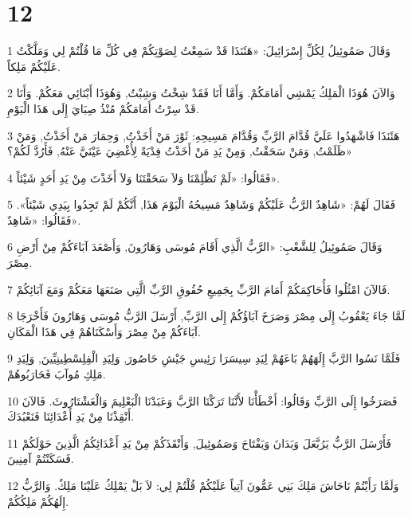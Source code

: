 \chapter{12}

\par 1 وَقَالَ صَمُوئِيلُ لِكُلِّ إِسْرَائِيلَ: «هَئَنَذَا قَدْ سَمِعْتُ لِصَوْتِكُمْ فِي كُلِّ مَا قُلْتُمْ لِي وَمَلَّكْتُ عَلَيْكُمْ مَلِكاً.
\par 2 وَالآنَ هُوَذَا الْمَلِكُ يَمْشِي أَمَامَكُمْ. وَأَمَّا أَنَا فَقَدْ شِخْتُ وَشِبْتُ, وَهُوَذَا أَبْنَائِي مَعَكُمْ. وَأَنَا قَدْ سِرْتُ أَمَامَكُمْ مُنْذُ صِبَايَ إِلَى هَذَا الْيَوْمِ.
\par 3 هَئَنَذَا فَاشْهَدُوا عَلَيَّ قُدَّامَ الرَّبِّ وَقُدَّامَ مَسِيحِهِ: ثَوْرَ مَنْ أَخَذْتُ, وَحِمَارَ مَنْ أَخَذْتُ, وَمَنْ ظَلَمْتُ, وَمَنْ سَحَقْتُ, وَمِنْ يَدِ مَنْ أَخَذْتُ فِدْيَةً لِأُغْضِيَ عَيْنَيَّ عَنْهُ, فَأَرُدَّ لَكُمْ؟»
\par 4 فَقَالُوا: «لَمْ تَظْلِمْنَا وَلاَ سَحَقْتَنَا وَلاَ أَخَذْتَ مِنْ يَدِ أَحَدٍ شَيْئاً».
\par 5 فَقَالَ لَهُمْ: «شَاهِدٌ الرَّبُّ عَلَيْكُمْ وَشَاهِدٌ مَسِيحُهُ الْيَوْمَ هَذَا, أَنَّكُمْ لَمْ تَجِدُوا بِيَدِي شَيْئاً». فَقَالُوا: «شَاهِدٌ».
\par 6 وَقَالَ صَمُوئِيلُ لِلشَّعْبِ: «الرَّبُّ الَّذِي أَقَامَ مُوسَى وَهَارُونَ, وَأَصْعَدَ آبَاءَكُمْ مِنْ أَرْضِ مِصْرَ.
\par 7 فَالآنَ امْثُلُوا فَأُحَاكِمَكُمْ أَمَامَ الرَّبِّ بِجَمِيعِ حُقُوقِ الرَّبِّ الَّتِي صَنَعَهَا مَعَكُمْ وَمَعَ آبَائِكُمْ.
\par 8 لَمَّا جَاءَ يَعْقُوبُ إِلَى مِصْرَ وَصَرَخَ آبَاؤُكُمْ إِلَى الرَّبِّ, أَرْسَلَ الرَّبُّ مُوسَى وَهَارُونَ فَأَخْرَجَا آبَاءَكُمْ مِنْ مِصْرَ وَأَسْكَنَاهُمْ فِي هَذَا الْمَكَانِ.
\par 9 فَلَمَّا نَسُوا الرَّبَّ إِلَهَهُمْ بَاعَهُمْ لِيَدِ سِيسَرَا رَئِيسِ جَيْشِ حَاصُورَ, وَلِيَدِ الْفِلِسْطِينِيِّينَ, وَلِيَدِ مَلِكِ مُوآبَ فَحَارَبُوهُمْ.
\par 10 فَصَرَخُوا إِلَى الرَّبِّ وَقَالُوا: أَخْطَأْنَا لأَنَّنَا تَرَكْنَا الرَّبَّ وَعَبَدْنَا الْبَعْلِيمَ وَالْعَشْتَارُوثَ. فَالآنَ أَنْقِذْنَا مِنْ يَدِ أَعْدَائِنَا فَنَعْبُدَكَ.
\par 11 فَأَرْسَلَ الرَّبُّ يَرُبَّعَلَ وَبَدَانَ وَيَفْتَاحَ وَصَمُوئِيلَ, وَأَنْقَذَكُمْ مِنْ يَدِ أَعْدَائِكُمُ الَّذِينَ حَوْلَكُمْ فَسَكَنْتُمْ آمِنِينَ.
\par 12 وَلَمَّا رَأَيْتُمْ نَاحَاشَ مَلِكَ بَنِي عَمُّونَ آتِياً عَلَيْكُمْ قُلْتُمْ لِي: لاَ بَلْ يَمْلِكُ عَلَيْنَا مَلِكٌ. وَالرَّبُّ إِلَهُكُمْ مَلِكُكُمْ.
